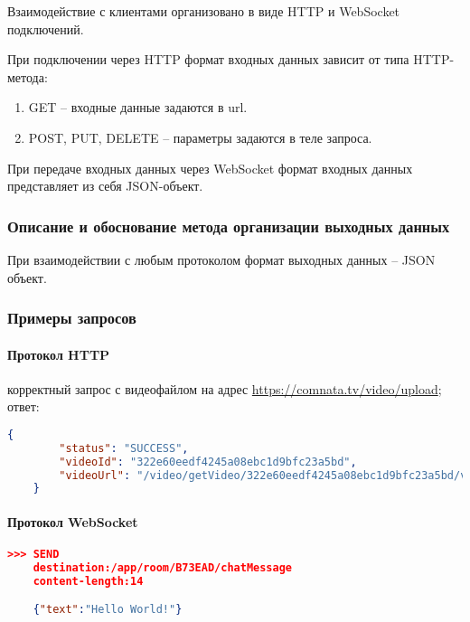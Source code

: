 \documentclass{../includes/TechDoc}
\begin{document}
    Взаимодействие с клиентами организовано в виде HTTP и WebSocket подключений.

    При подключении через HTTP формат входных данных зависит от типа HTTP-метода:
    \begin{enumerate}
        \item GET -- входные данные задаются в url.
        \item POST, PUT, DELETE -- параметры задаются в теле запроса.
    \end{enumerate}

    При передаче входных данных через WebSocket формат входных данных представляет из себя JSON-объект.

    \subsubsection{Описание и обоснование метода организации выходных данных}

    При взаимодействии с любым протоколом формат выходных данных -- JSON объект.

    \subsubsection{Примеры запросов}

    \paragraph{Протокол HTTP}

     корректный запрос с видеофайлом на адрес \url{https://comnata.tv/video/upload};\\

     ответ:
    \begin{lstlisting}[language=json,caption={Пример ответа при работе с HTTP протоколом}]
    {
  		"status": "SUCCESS",
  		"videoId": "322e60eedf4245a08ebc1d9bfc23a5bd",
  		"videoUrl": "/video/getVideo/322e60eedf4245a08ebc1d9bfc23a5bd/video.m3u8"
	}
    \end{lstlisting}

    \paragraph{Протокол WebSocket}

    \begin{lstlisting}[language=json,caption={Пример запроса при работе с WebSocket протоколом}]
    >>> SEND
	destination:/app/room/B73EAD/chatMessage
	content-length:14

	{"text":"Hello World!"}
    \end{lstlisting}
\end{document}
